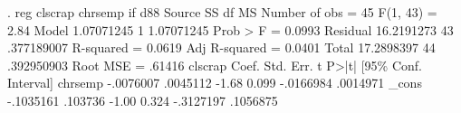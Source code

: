 . reg clscrap chrsemp if d88
{\smallskip}
      Source {\VBAR}       SS           df       MS      Number of obs   =        45
   F(1, 43)        =      2.84
       Model {\VBAR}  1.07071245         1  1.07071245   Prob > F        =    0.0993
    Residual {\VBAR}  16.2191273        43  .377189007   R-squared       =    0.0619
   Adj R-squared   =    0.0401
       Total {\VBAR}  17.2898397        44  .392950903   Root MSE        =    .61416
{\smallskip}
     clscrap {\VBAR}      Coef.   Std. Err.      t    P>|t|     [95\% Conf. Interval]
     chrsemp {\VBAR}  -.0076007   .0045112    -1.68   0.099    -.0166984    .0014971
       _cons {\VBAR}  -.1035161    .103736    -1.00   0.324    -.3127197    .1056875
{\smallskip}
